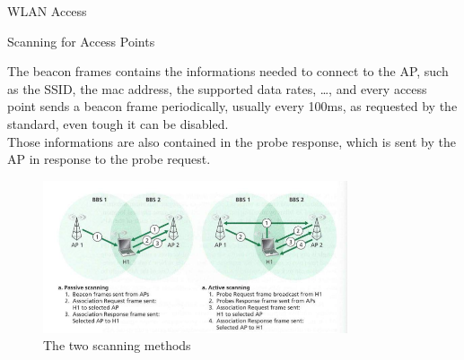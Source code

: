 \begin{section}{WLAN Access}
\begin{subsection}{Scanning for Access Points}
\begin{itemize}
    \end{itemize}
    The beacon frames contains the informations needed to connect to the AP, such as the SSID, the
    mac address, the supported data rates, \dots, and every access point sends a beacon frame periodically, 
    usually every 100ms, as requested by the standard, even tough it can be disabled.\\
    Those informations are also contained in the probe response, which is sent by the AP in response to the
    probe request.
    \begin{figure}[h]
      \centering
      \includegraphics[width=0.8\textwidth]{img/wireless/wlan scanning.png}
      \caption{The two scanning methods}
    \end{figure}
  \end{subsection}
\end{section}
